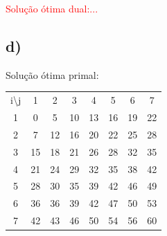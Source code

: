 \documentclass[11pt]{article} %
\begin{document}
\textcolor{red}{Solução ótima dual:...}

\newpage

\subsection*{d)}
Solução ótima primal:

\begin{table}[h]
\centering
\begin{tabular}{cccccccc}
i\textbackslash{}j     & 1                       & 2                       & 3                       & 4                       & 5                       & 6                       & 7                       \\ \cline{2-8}
\multicolumn{1}{c|}{1} & \multicolumn{1}{c|}{0}  & \multicolumn{1}{c|}{5}  & \multicolumn{1}{c|}{10} & \multicolumn{1}{c|}{13} & \multicolumn{1}{c|}{16} & \multicolumn{1}{c|}{19} & \multicolumn{1}{c|}{22} \\ \cline{2-8}
\multicolumn{1}{c|}{2} & \multicolumn{1}{c|}{7}  & \multicolumn{1}{c|}{12} & \multicolumn{1}{c|}{16} & \multicolumn{1}{c|}{20} & \multicolumn{1}{c|}{22} & \multicolumn{1}{c|}{25} & \multicolumn{1}{c|}{28} \\ \cline{2-8}
\multicolumn{1}{c|}{3} & \multicolumn{1}{c|}{15} & \multicolumn{1}{c|}{18} & \multicolumn{1}{c|}{21} & \multicolumn{1}{c|}{26} & \multicolumn{1}{c|}{28} & \multicolumn{1}{c|}{32} & \multicolumn{1}{c|}{35} \\ \cline{2-8}
\multicolumn{1}{c|}{4} & \multicolumn{1}{c|}{21} & \multicolumn{1}{c|}{24} & \multicolumn{1}{c|}{29} & \multicolumn{1}{c|}{32} & \multicolumn{1}{c|}{35} & \multicolumn{1}{c|}{38} & \multicolumn{1}{c|}{42} \\ \cline{2-8}
\multicolumn{1}{c|}{5} & \multicolumn{1}{c|}{28} & \multicolumn{1}{c|}{30} & \multicolumn{1}{c|}{35} & \multicolumn{1}{c|}{39} & \multicolumn{1}{c|}{42} & \multicolumn{1}{c|}{46} & \multicolumn{1}{c|}{49} \\ \cline{2-8}
\multicolumn{1}{c|}{6} & \multicolumn{1}{c|}{36} & \multicolumn{1}{c|}{36} & \multicolumn{1}{c|}{39} & \multicolumn{1}{c|}{42} & \multicolumn{1}{c|}{47} & \multicolumn{1}{c|}{50} & \multicolumn{1}{c|}{53} \\ \cline{2-8}
\multicolumn{1}{c|}{7} & \multicolumn{1}{c|}{42} & \multicolumn{1}{c|}{43} & \multicolumn{1}{c|}{46} & \multicolumn{1}{c|}{50} & \multicolumn{1}{c|}{54} & \multicolumn{1}{c|}{56} & \multicolumn{1}{c|}{60} \\ \cline{2-8}
\end{tabular}
\end{table}
\end{document}
